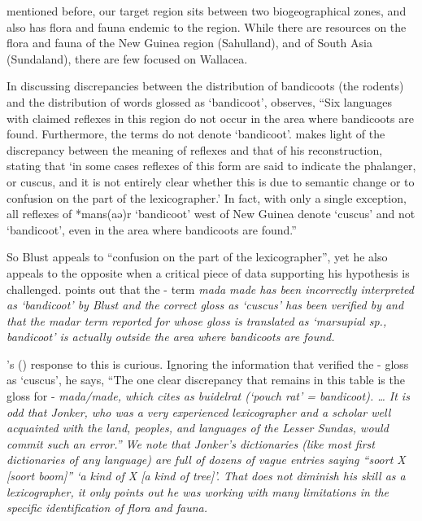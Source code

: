  mentioned before, our target region sits between two biogeographical
zones, and also has flora
and fauna endemic to the region.
While there are resources on the flora
and fauna of the New Guinea region (Sahulland),
and of South Asia (Sundaland),
there are few focused on Wallacea.

In discussing discrepancies between the distribution of bandicoots
(the rodents) and the distribution of words glossed as ‘bandicoot’,
\citet[262--263]{Schapper2011} observes, “Six languages with claimed
reflexes in this region do not occur in the area where bandicoots are found.
Furthermore, the terms do not denote ‘bandicoot’.
\citet[110]{Blust2002} makes light of the discrepancy between the meaning
of reflexes and that of his reconstruction,
stating that ‘in some cases reflexes of this form are said to
indicate the phalanger, or cuscus, and it is
not entirely clear whether this is due to
semantic change or to confusion on the part of the lexicographer.’
In fact, with only a single exception,
all reflexes of *mans(aə)r ‘bandicoot’ west of New Guinea denote
‘cuscus’ and not ‘bandicoot’, even in the area where bandicoots are found.”

So Blust appeals to “confusion on the part of the lexicographer”,
yet he also appeals to the opposite when a critical piece of
data supporting his hypothesis is challenged.
\citet[263]{Schapper2011} points out that the - term \it{mada
{\tl} made} has been incorrectly interpreted as ‘bandicoot’ by
Blust and the correct gloss as ‘cuscus’ has been verified by
\citet{vanEngelenhoven2004}
and that the \it{madar} term reported for  whose gloss is
translated as ‘marsupial sp.,
bandicoot’ is actually outside the area where bandicoots are found.

\citeauthor{Blust2012b}'s (\citeyear[264]{Blust2012b}) response to this is curious.
Ignoring the information that \citeauthor{vanEngelenhoven2004} verified the -
gloss as ‘cuscus’, he says, “The one clear discrepancy that remains in this table
is the gloss for - \it{mada/made},
which \citet{Jonker1932} cites as buidelrat (‘pouch rat’ = bandicoot).
{\ldots} It is odd that Jonker,
who was a very experienced lexicographer
and a scholar well acquainted with the land,
peoples, and languages of the Lesser Sundas,
would commit such an error.” We note that Jonker’s dictionaries
(like most first dictionaries of any language) are full of dozens
of vague entries saying “soort X [soort boom]” ‘a kind of X [a kind of tree]’.
That does not diminish his skill as a lexicographer,
it only points out he was working with many limitations in the
specific identification of flora and fauna.

